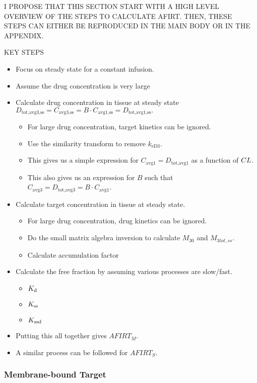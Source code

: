 I PROPOSE THAT THIS SECTION START WITH A HIGH LEVEL OVERVIEW OF THE STEPS TO CALCULATE AFIRT.  THEN, THESE STEPS CAN EITHER BE REPRODUCED IN THE MAIN BODY OR IN THE APPENDIX.  

KEY STEPS
\begin{itemize}
\item Focus on steady state for a constant infusion.
\item Assume the drug concentration is very large
\item Calculate drug concentration in tissue at steady state $D_\text{tot,avg3,ss} = C_\text{avg3,ss} = B\cdot C_\text{avg1,ss} = D_\text{tot,avg1,ss}.$
	\begin{itemize}
		\item  For large drug concentration, target kinetics can be ignored. 
		\item Use the similarity transform to remove $k_\text{eD3}$.
		\item This gives us a simple expression for $C_\text{avg1} = D_\text{tot,avg1}$ as a function of $CL$.
		\item This also gives us an expression for $B$ such that $C_\text{avg3} = D_\text{tot,avg3} = B\cdot C_\text{avg1}$.
	\end{itemize}
\item Calculate target concentration in tissue at steady state.
	\begin{itemize}
		\item For large drug concentration, drug kinetics can be ignored.
		\item Do the small matrix algebra inversion to calculate $M_{30}$ and $M_{3tot,ss}$.
		\item Calculate accumulation factor
	\end{itemize}
\item Calculate the free fraction by assuming various processes are slow/fast.
	\begin{itemize}
		\item $K_\text{d}$
		\item $K_\text{ss}$
		\item $K_\text{ssd}$
	\end{itemize}	
\item Putting this all together gives $AFIRT_M$.  
\item A similar process can be followed for $AFIRT_S$.	
\end{itemize}



\subsubsection{Membrane-bound Target}

